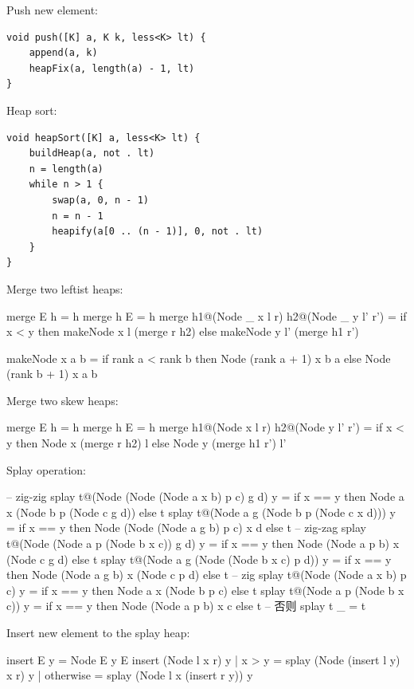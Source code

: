 \documentclass[b5paper]{article}
\begin{document}
Push new element:

\begin{lstlisting}[language = Bourbaki]
void push([K] a, K k, less<K> lt) {
    append(a, k)
    heapFix(a, length(a) - 1, lt)
}
\end{lstlisting}

Heap sort:

\begin{lstlisting}[language = Bourbaki]
void heapSort([K] a, less<K> lt) {
    buildHeap(a, not . lt)
    n = length(a)
    while n > 1 {
        swap(a, 0, n - 1)
        n = n - 1
        heapify(a[0 .. (n - 1)], 0, not . lt)
    }
}
\end{lstlisting}

Merge two leftist heaps:

\begin{Haskell}
merge E h = h
merge h E = h
merge h1@(Node _ x l r) h2@(Node _ y l' r') =
    if x < y then makeNode x l (merge r h2)
    else makeNode y l' (merge h1 r')

makeNode x a b = if rank a < rank b then Node (rank a + 1) x b a
                 else Node (rank b + 1) x a b
\end{Haskell}

Merge two skew heaps:

\begin{Haskell}
merge E h = h
merge h E = h
merge h1@(Node x l r) h2@(Node y l' r') =
    if x < y then Node x (merge r h2) l
    else Node y (merge h1 r') l'
\end{Haskell}

Splay operation:

\begin{Haskell}
-- zig-zig
splay t@(Node (Node (Node a x b) p c) g d) y =
    if x == y then Node a x (Node b p (Node c g d)) else t
splay t@(Node a g (Node b p (Node c x d))) y =
    if x == y then Node (Node (Node a g b) p c) x d else t
-- zig-zag
splay t@(Node (Node a p (Node b x c)) g d) y =
    if x == y then Node (Node a p b) x (Node c g d) else t
splay t@(Node a g (Node (Node b x c) p d)) y =
    if x == y then Node (Node a g b) x (Node c p d) else t
-- zig
splay t@(Node (Node a x b) p c) y = if x == y then Node a x (Node b p c) else t
splay t@(Node a p (Node b x c)) y = if x == y then Node (Node a p b) x c else t
-- 否则
splay t _ = t
\end{Haskell}

Insert new element to the splay heap:

\begin{Haskell}
insert E y = Node E y E
insert (Node l x r) y
    | x > y     = splay (Node (insert l y) x r) y
    | otherwise = splay (Node l x (insert r y)) y
\end{Haskell}
\end{document}
